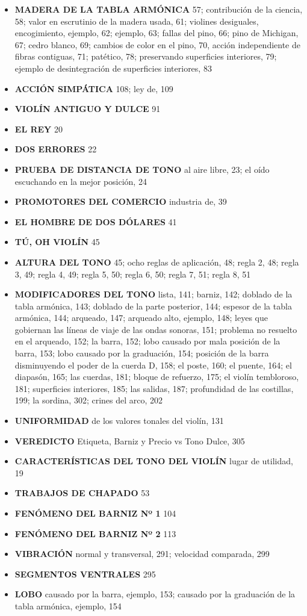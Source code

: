 \documentclass[12pt]{book}
\begin{document}
\begin{itemize}
    \item \textbf{MADERA DE LA TABLA ARMÓNICA} 57; contribución de la ciencia, 58; valor en escrutinio de la madera usada, 61; violines desiguales, encogimiento, ejemplo, 62; ejemplo, 63; fallas del pino, 66; pino de Michigan, 67; cedro blanco, 69; cambios de color en el pino, 70, acción independiente de fibras contiguas, 71; patético, 78; preservando superficies interiores, 79; ejemplo de desintegración de superficies interiores, 83
    \item \textbf{ACCIÓN SIMPÁTICA} 108; ley de, 109
    \item \textbf{VIOLÍN ANTIGUO Y DULCE} 91
    \item \textbf{EL REY} 20
    \item \textbf{DOS ERRORES} 22
    \item \textbf{PRUEBA DE DISTANCIA DE TONO} al aire libre, 23; el oído escuchando en la mejor posición, 24
    \item \textbf{PROMOTORES DEL COMERCIO} industria de, 39
    \item \textbf{EL HOMBRE DE DOS DÓLARES} 41
    \item \textbf{TÚ, OH VIOLÍN} 45
    \item \textbf{ALTURA DEL TONO} 45; ocho reglas de aplicación, 48; regla 2, 48; regla 3, 49; regla 4, 49; regla 5, 50; regla 6, 50; regla 7, 51; regla 8, 51
    \item \textbf{MODIFICADORES DEL TONO} lista, 141; barniz, 142; doblado de la tabla armónica, 143; doblado de la parte posterior, 144; espesor de la tabla armónica, 144; arqueado, 147; arqueado alto, ejemplo, 148; leyes que gobiernan las líneas de viaje de las ondas sonoras, 151; problema no resuelto en el arqueado, 152; la barra, 152; lobo causado por mala posición de la barra, 153; lobo causado por la graduación, 154; posición de la barra disminuyendo el poder de la cuerda D, 158; el poste, 160; el puente, 164; el diapasón, 165; las cuerdas, 181; bloque de refuerzo, 175; el violín tembloroso, 181; superficies interiores, 185; las salidas, 187; profundidad de las costillas, 199; la sordina, 302; crines del arco, 202
    \item \textbf{UNIFORMIDAD} de los valores tonales del violín, 131
    \item \textbf{VEREDICTO} Etiqueta, Barniz y Precio vs Tono Dulce, 305
    \item \textbf{CARACTERÍSTICAS DEL TONO DEL VIOLÍN} lugar de utilidad, 19
    \item \textbf{TRABAJOS DE CHAPADO} 53
    \item \textbf{FENÓMENO DEL BARNIZ Nº 1} 104
    \item \textbf{FENÓMENO DEL BARNIZ Nº 2} 113
    \item \textbf{VIBRACIÓN} normal y transversal, 291; velocidad comparada, 299
    \item \textbf{SEGMENTOS VENTRALES} 295
    \item \textbf{LOBO} causado por la barra, ejemplo, 153; causado por la graduación de la tabla armónica, ejemplo, 154
\end{itemize}
\end{document}
